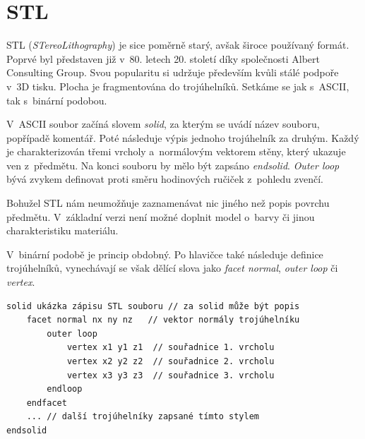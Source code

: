 \documentclass[12pt]{report}			%
\begin{document}
            \section{STL}

                STL (\emph{STereoLithography}) je sice poměrně starý, avšak široce používaný formát. Poprvé byl představen již v~80. letech 20. století díky společnosti Albert Consulting Group. Svou popularitu si udržuje především kvůli stálé podpoře v~3D tisku. Plocha je fragmentována do trojúhelníků.  Setkáme se jak s~ASCII, tak s~binární podobou. \cite{all3dp}

                V~ASCII soubor začíná slovem \emph{solid}, za kterým se uvádí název souboru, popřípadě komentář. Poté následuje výpis jednoho trojúhelník za druhým. Každý je charakterizován třemi vrcholy a~normálovým vektorem stěny, který ukazuje ven z~předmětu. Na konci souboru by mělo být zapsáno \emph{endsolid}. \emph{Outer loop} bývá zvykem definovat proti směru hodinových ručiček z~pohledu zvenčí.  \cite{fabbers}

                Bohužel STL nám neumožňuje zaznamenávat nic jiného než popis povrchu předmětu. V~základní verzi není možné doplnit model o~barvy či jinou charakteristiku materiálu. \cite{sustainabilityofdigitalformats}

                V~binární podobě je princip obdobný. Po hlavičce také následuje definice trojúhelníků, vynechávají se však dělící slova jako \emph{facet normal}, \emph{outer loop} či \emph{vertex}.
                \cite{sustainabilityofdigitalformats}\cite{fabbers}



                \begin{lstlisting}[style=stlstyle]
solid ukázka zápisu STL souboru // za solid může být popis
    facet normal nx ny nz   // vektor normály trojúhelníku
        outer loop
            vertex x1 y1 z1  // souřadnice 1. vrcholu
            vertex x2 y2 z2  // souřadnice 2. vrcholu
            vertex x3 y3 z3  // souřadnice 3. vrcholu
        endloop
    endfacet
    ... // další trojúhelníky zapsané tímto stylem
endsolid
                \end{lstlisting}
\end{document}
